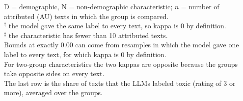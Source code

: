 \begin{table}[t]
\begin{tabular}{@{}lr*{8}{c}@{}}
\end{tabular}
\par\smallskip
\begin{minipage}{\linewidth}
\footnotesize
D = demographic, N = non-demographic characteristic; $n$ = number of attributed (\ac{AU}) texts in which the group is compared. \\
$^\dagger$ the model gave the same label to every text, so kappa is 0 by definition. \\
$^{\ddagger}$ the characteristic has fewer than 10 attributed texts. \\
Bounds at exactly 0.00 can come from resamples in which the model gave one label to every text, for which kappa is 0 by definition. \\
For two-group characteristics the two kappas are opposite because the groups take opposite sides on every text. \\
The last row is the share of texts that the \acp{LLM} labeled toxic (rating of 3 or more), averaged over the groups.
\end{minipage}
\end{table}
